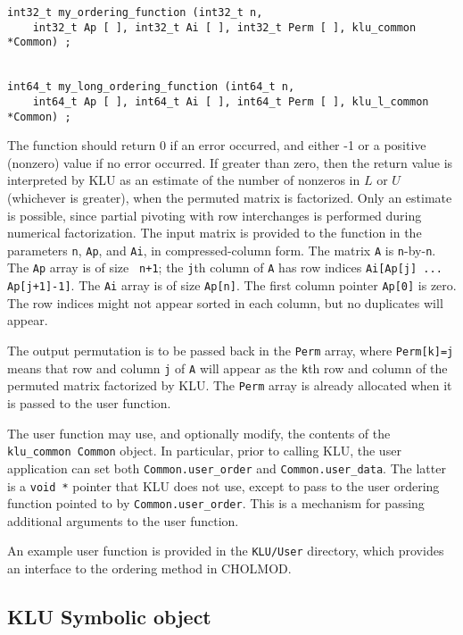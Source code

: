\documentclass[11pt]{article}
\begin{document}
\begin{itemize}
{\footnotesize
\begin{verbatim}
int32_t my_ordering_function (int32_t n,
    int32_t Ap [ ], int32_t Ai [ ], int32_t Perm [ ], klu_common *Common) ;


int64_t my_long_ordering_function (int64_t n,
    int64_t Ap [ ], int64_t Ai [ ], int64_t Perm [ ], klu_l_common *Common) ;
\end{verbatim}
}

The function should return 0 if an error occurred, and either -1 or a positive
(nonzero) value if no error occurred.  If greater than zero, then the return
value is interpreted by KLU as an estimate of the number of nonzeros in $L$ or
$U$ (whichever is greater), when the permuted matrix is factorized.  Only an
estimate is possible, since partial pivoting with row interchanges is performed
during numerical factorization.  The input matrix is provided to the function
in the parameters {\tt n}, {\tt Ap}, and {\tt Ai}, in compressed-column form.
The matrix {\tt A} is {\tt n}-by-{\tt n}.  The {\tt Ap} array is of size {\tt
n+1}; the {\tt j}th column of {\tt A} has row indices {\tt Ai[Ap[j] ...
Ap[j+1]-1]}.  The {\tt Ai} array is of size {\tt Ap[n]}.  The first column
pointer {\tt Ap[0]} is zero.  The row indices might not appear sorted in each
column, but no duplicates will appear.

The output permutation is to be passed back in the {\tt Perm} array, where
{\tt Perm[k]=j} means that row and column {\tt j} of {\tt A} will appear as
the {\tt k}th row and column of the permuted matrix factorized by KLU.  The
{\tt Perm} array is already allocated when it is passed to the user function.

The user function may use, and optionally modify, the contents of the {\tt
klu\_common Common} object.  In particular, prior to calling KLU, the user
application can set both {\tt Common.user\_order} and {\tt Common.user\_data}.
The latter is a {\tt void *} pointer that KLU does not use, except to pass to
the user ordering function pointed to by {\tt Common.user\_order}.  This is a
mechanism for passing additional arguments to the user function.

An example user function is provided in the {\tt KLU/User} directory, which
provides an interface to the ordering method in CHOLMOD.

\end{itemize}

\subsection{KLU Symbolic object}
\end{document}
